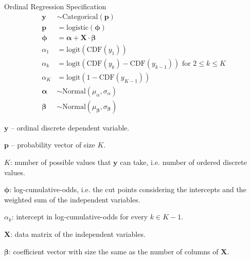 \begin{frame}{Ordinal Regression Specification}
	\footnotesize
	$$
		\begin{aligned}
			\mathbf{y}          & \sim \text{Categorical}(\mathbf{p})                                                \\
			\mathbf{p}          & = \text{logistic}(\boldsymbol{\phi})                                               \\
			\boldsymbol{\phi}   & = \boldsymbol{\alpha} + \mathbf{X} \cdot \boldsymbol{\beta}                        \\
			\alpha_1            & = \text{logit}(\text{CDF}(y_1))                                                    \\
			\alpha_k            & = \text{logit}(\text{CDF}(y_k) - \text{CDF}(y_{k-1})) \text{ for } 2 \leq k \leq K \\
			\alpha_{K}          & = \text{logit}(1 - \text{CDF}(y_{K-1}))                                            \\
			\boldsymbol{\alpha} & \sim \text{Normal}(\mu_\alpha, \sigma_\alpha)                                      \\
			\boldsymbol{\beta}  & \sim \text{Normal}(\mu_{\boldsymbol{\beta}}, \sigma_{\boldsymbol{\beta}})
		\end{aligned}
	$$
	\begin{vfilleditems}
		\footnotesize{
			\item $\mathbf{y}$ -- ordinal discrete dependent variable.
			\item $\mathbf{p}$ -- probability vector of size $K$.
			\item $K$: number of possible values that $\mathbf{y}$ can take, i.e. number of ordered discrete values.
			\item $\boldsymbol{\phi}$: log-cumulative-odds, i.e. the cut points considering the intercepts and the weighted sum of the independent variables.
			\item $\alpha_k$: intercept in log-cumulative-odds for every $k \in K-1$.
			\item $\mathbf{X}$: data matrix of the independent variables.
			\item $\boldsymbol{\beta}$: coefficient vector with size the same as the number of columns of $\mathbf{X}$.
		}
	\end{vfilleditems}
\end{frame}
